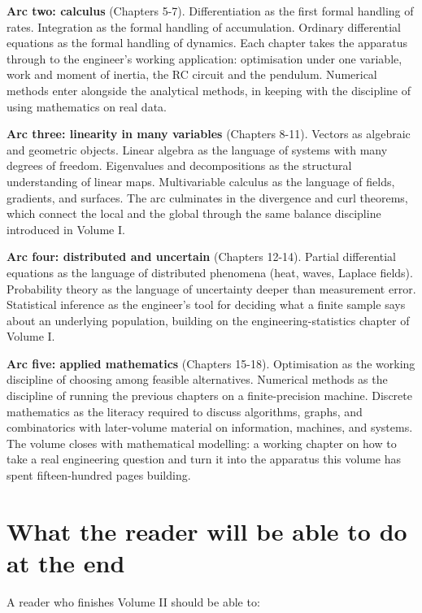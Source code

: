 \textbf{Arc two: calculus} (Chapters 5-7). Differentiation as the first formal handling of rates. Integration as the formal handling of accumulation. Ordinary differential equations as the formal handling of dynamics. Each chapter takes the apparatus through to the engineer's working application: optimisation under one variable, work and moment of inertia, the RC circuit and the pendulum. Numerical methods enter alongside the analytical methods, in keeping with the discipline of using mathematics on real data.

\textbf{Arc three: linearity in many variables} (Chapters 8-11). Vectors as algebraic and geometric objects. Linear algebra as the language of systems with many degrees of freedom. Eigenvalues and decompositions as the structural understanding of linear maps. Multivariable calculus as the language of fields, gradients, and surfaces. The arc culminates in the divergence and curl theorems, which connect the local and the global through the same balance discipline introduced in Volume I.

\textbf{Arc four: distributed and uncertain} (Chapters 12-14). Partial differential equations as the language of distributed phenomena (heat, waves, Laplace fields). Probability theory as the language of uncertainty deeper than measurement error. Statistical inference as the engineer's tool for deciding what a finite sample says about an underlying population, building on the engineering-statistics chapter of Volume I.

\textbf{Arc five: applied mathematics} (Chapters 15-18). Optimisation as the working discipline of choosing among feasible alternatives. Numerical methods as the discipline of running the previous chapters on a finite-precision machine. Discrete mathematics as the literacy required to discuss algorithms, graphs, and combinatorics with later-volume material on information, machines, and systems. The volume closes with mathematical modelling: a working chapter on how to take a real engineering question and turn it into the apparatus this volume has spent fifteen-hundred pages building.

\section*{What the reader will be able to do at the end}

A reader who finishes Volume II should be able to:

